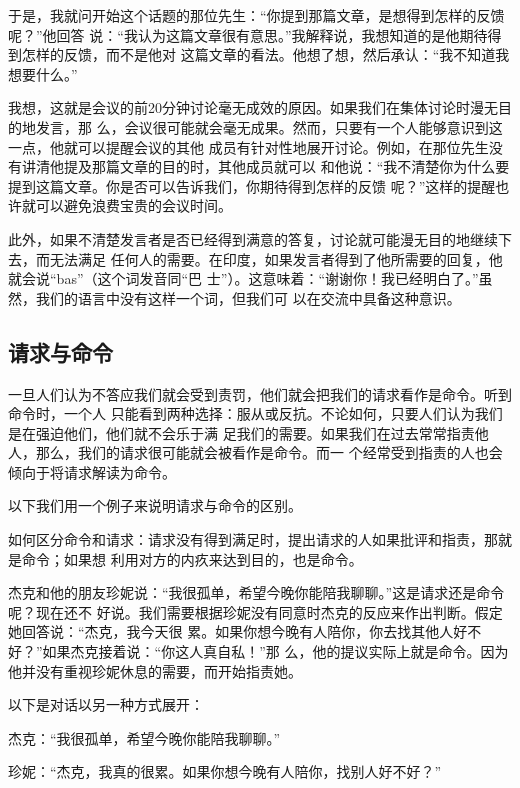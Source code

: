 \documentclass{ctexart}
\renewenvironment{quotation}{\setlength{\parskip}{0.5em}\setstretch{1.5}\kaishu\zihao{-5}\setlength{\parindent}{1em}}{\vspace{1em}}
\begin{document}
于是，我就问开始这个话题的那位先生：``你提到那篇文章，是想得到怎样的反馈呢？''他回答
说：``我认为这篇文章很有意思。''我解释说，我想知道的是他期待得到怎样的反馈，而不是他对
这篇文章的看法。他想了想，然后承认：``我不知道我想要什么。''

我想，这就是会议的前20分钟讨论毫无成效的原因。如果我们在集体讨论时漫无目的地发言，那
么，会议很可能就会毫无成果。然而，只要有一个人能够意识到这一点，他就可以提醒会议的其他
成员有针对性地展开讨论。例如，在那位先生没有讲清他提及那篇文章的目的时，其他成员就可以
和他说：``我不清楚你为什么要提到这篇文章。你是否可以告诉我们，你期待得到怎样的反馈
呢？''这样的提醒也许就可以避免浪费宝贵的会议时间。

此外，如果不清楚发言者是否已经得到满意的答复，讨论就可能漫无目的地继续下去，而无法满足
任何人的需要。在印度，如果发言者得到了他所需要的回复，他就会说``bas''（这个词发音同``巴
士''）。这意味着：``谢谢你！我已经明白了。''虽然，我们的语言中没有这样一个词，但我们可
以在交流中具备这种意识。

\subsection{请求与命令}

一旦人们认为不答应我们就会受到责罚，他们就会把我们的请求看作是命令。听到命令时，一个人
只能看到两种选择：服从或反抗。不论如何，只要人们认为我们是在强迫他们，他们就不会乐于满
足我们的需要。如果我们在过去常常指责他人，那么，我们的请求很可能就会被看作是命令。而一
个经常受到指责的人也会倾向于将请求解读为命令。

以下我们用一个例子来说明请求与命令的区别。

如何区分命令和请求：请求没有得到满足时，提出请求的人如果批评和指责，那就是命令；如果想
利用对方的内疚来达到目的，也是命令。

杰克和他的朋友珍妮说：``我很孤单，希望今晚你能陪我聊聊。''这是请求还是命令呢？现在还不
好说。我们需要根据珍妮没有同意时杰克的反应来作出判断。假定她回答说：``杰克，我今天很
累。如果你想今晚有人陪你，你去找其他人好不好？''如果杰克接着说：``你这人真自私！''那
么，他的提议实际上就是命令。因为他并没有重视珍妮休息的需要，而开始指责她。

以下是对话以另一种方式展开：

\begin{quotation}
	杰克：``我很孤单，希望今晚你能陪我聊聊。''

	珍妮：``杰克，我真的很累。如果你想今晚有人陪你，找别人好不好？''
\end{quotation}
\end{document}
